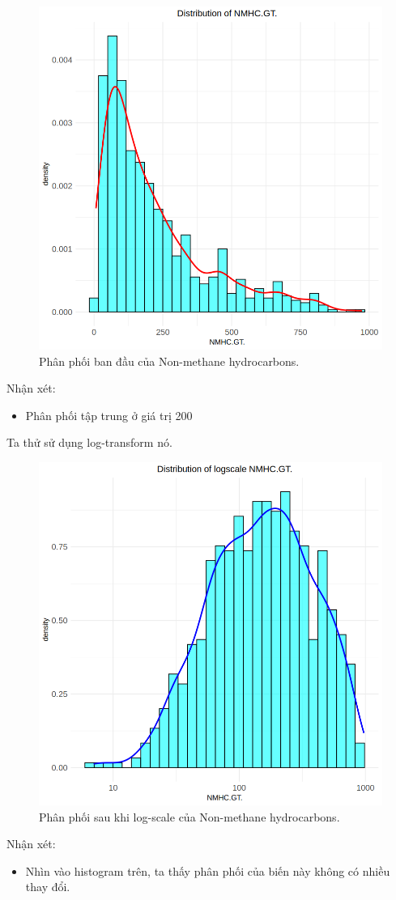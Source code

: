 \begin{figure}[H]
    \centering
    \includegraphics[width=0.75\columnwidth]{air_figures/NMHC(GT)_original_distribution.png}
    \caption{Phân phối ban đầu của Non-methane hydrocarbons.}
    \label{fig:nmhc_original_distribution}
\end{figure}

Nhận xét:
\begin{itemize}
    \item Phân phối tập trung ở giá trị 200
\end{itemize}

Ta thử sử dụng log-transform nó.

\begin{figure}[H]
    \centering
    \includegraphics[width=0.75\columnwidth]{air_figures/NMHC(GT)_logscale_distribution.png}
    \caption{Phân phối sau khi log-scale của Non-methane hydrocarbons.}
    \label{fig:nmhc_logscale_distribution}
\end{figure}
Nhận xét:
\begin{itemize}
    \item Nhìn vào histogram trên, ta thấy phân phối của biến này không có nhiều thay đổi.
\end{itemize}

